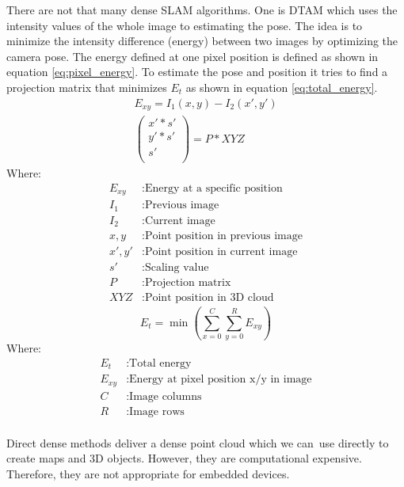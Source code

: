 \documentclass[11pt,a4paper,titlepage,oneside]{report}
\begin{document}
There are not that many dense SLAM algorithms. One is DTAM \cite{dtam} which uses the intensity values of the whole image to estimating the pose. The idea is to minimize the intensity difference (energy) between two images by optimizing the camera pose. The energy defined at one pixel position is defined as shown in equation \ref{eq:pixel_energy}. To estimate the pose and position it tries to find a projection matrix that minimizes $E_{t}$ as shown in equation \ref{eq:total_energy}.
\begin{equation}\label{eq:pixel_energy}
\begin{aligned}
  E_{xy}=I_1(x,y)-I_2(x',y')\\
	\begin{pmatrix}
	x'*s'\\
	y'*s'\\
	s'\\
	\end{pmatrix}=P*XYZ
\end{aligned}
\end{equation}
Where:
\begin{align*}
  E_{xy}	&: \text{Energy at a specific position}\\
  I_1			&: \text{Previous image}\\
  I_2			&: \text{Current image}\\
  x,y			&: \text{Point position in previous image} \\
  x',y'		&: \text{Point position in current image} \\
	s'			&: \text{Scaling value}\\
  P				&: \text{Projection matrix}\\
  XYZ			&: \text{Point position in 3D cloud}
\end{align*}
\begin{equation}\label{eq:total_energy}
  E_{t}=\min(\sum_{x=0}^C\sum_{y=0}^RE_{xy})
\end{equation}
Where:
\begin{align*}
  E_{t}		&: \text{Total energy}\\
  E_{xy}	&: \text{Energy at pixel position x/y in image}\\
	C				&: \text{Image columns}\\
	R				&: \text{Image rows}\\
\end{align*}

Direct dense methods deliver a dense point cloud which we can use directly to create maps and 3D objects. However, they are computational expensive. Therefore, they are not appropriate for embedded devices.
\end{document}
